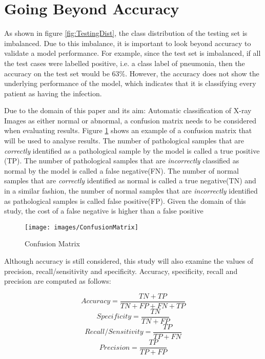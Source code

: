 
\section{Going Beyond Accuracy}\label{metrics}


As shown in figure \ref{fig:TestingDist}, the class distribution of the testing set is imbalanced. Due to this imbalance, it is important to look beyond accuracy to validate a model performance. For example, since the test set is imbalanced, if all the test cases were labelled positive, i.e. a class label of pneumonia, then the accuracy on the test set would be 63\%. However, the accuracy does not show the underlying performance of the model, which indicates that it is classifying every patient as having the infection.


Due to the domain of this paper and its aim: Automatic classification of X-ray Images as either normal or abnormal, a confusion matrix needs to be considered when evaluating results. Figure \ref{fig:ConfMatrix} shows an example of a confusion matrix that will be used to analyse results. The number of pathological samples that are \textit{correctly} identified as a pathological sample by the model is called a true positive (TP). The number of pathological samples that are \textit{incorrectly} classified as normal by the model is called a false negative(FN). The number of normal samples that are \textit{correctly} identified as normal is called a true negative(TN) and in a similar fashion, the number of normal samples that are \textit{incorrectly} identified as pathological samples is called false positive(FP). 
Given the domain of this study, the cost of a false negative is higher than a false positive

	
 \begin{figure}[H]
	\centering
	\hspace{-2cm}
	\texttt{[image: images/ConfusionMatrix]}
	\caption{Confusion Matrix}
	\label{fig:ConfMatrix}
\end{figure}



Although accuracy is still considered, this study will also examine the values of precision, recall/sensitivity and specificity. Accuracy, specificity, recall and precision are computed as follows:

\begin{center}

\[Accuracy=\frac{TN+TP}{TN+FP+FN+TP}\]
\vspace{.5em}
\[Specificity=\frac{TN}{TN+FP}\]
\vspace{.5em}
\[Recall/Sensitivity=\frac{TP}{TP+FN}\]
\vspace{.5em}
\[Precision=\frac{TP}{TP+FP}\]
\end{center}







